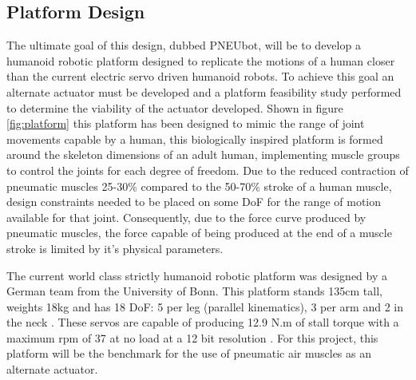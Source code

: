\documentclass[11pt,a4paper]{article}
\begin{document}
\subsection{Platform Design}
\label{sub:platform_design}
The ultimate goal of this design, dubbed PNEUbot, will be to develop a humanoid robotic platform designed to replicate the motions of a human closer than the current electric servo driven humanoid robots. To achieve this goal an alternate actuator must be developed and a platform feasibility study performed to determine the viability of the actuator developed. Shown in figure \ref{fig:platform} this platform has been designed to mimic the range of joint movements capable by a human, this biologically inspired platform is formed around the skeleton dimensions of an adult human, implementing muscle groups to control the joints for each degree of freedom. Due to the reduced contraction of pneumatic muscles 25-30\% compared to the 50-70\% stroke of a human muscle, design constraints needed to be placed on some DoF for the range of motion available for that joint. Consequently, due to the force curve produced by pneumatic muscles, the force capable of being produced at the end of a muscle stroke is limited by it's physical parameters. \newline

The current world class strictly humanoid robotic platform was designed by a German team from the University of Bonn. This platform stands 135cm tall, weights 18kg and has 18 DoF: 5 per leg (parallel kinematics), 3 per arm and 2 in the neck \cite{ficht_farazi_brandenburger_rodriguez_pavlichenko_allgeuer_hosseini_behnke_2018}. These servos are capable of producing 12.9 N.m of stall torque with a maximum rpm of 37 at no load at a 12 bit resolution \cite{robotis}. For this project, this platform will be the benchmark for the use of pneumatic air muscles as an alternate actuator. \newline
\end{document}
